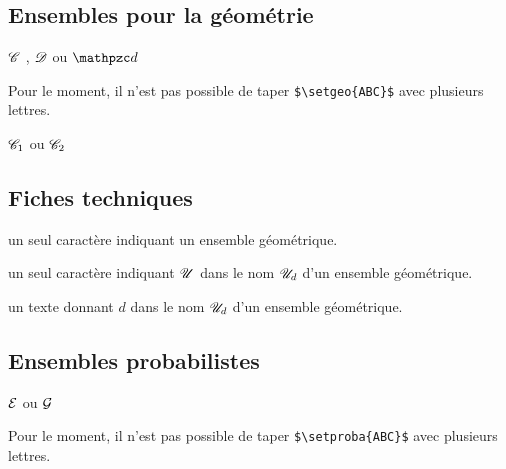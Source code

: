 \documentclass[12pt,a4paper]{article}
\begin{document}
\subsection{Ensembles pour la géométrie} \label{tnssets-geo-sets}

\newparaexample{}

\begin{latexex}
$\setgeo{C}$ ,
$\setgeo{D}$ ou
$\setgeo{d}$
\end{latexex}

\begin{remark}
	Pour le moment, il n'est pas possible de taper \verb+$\setgeo{ABC}$+ avec plusieurs lettres.
\end{remark}





\begin{latexex}
$\setgeo*{C}{1}$ ou
$\setgeo*{C}{2}$
\end{latexex}




\subsection{Fiches techniques}


\IDarg{} un seul caractère \ascii{} indiquant un ensemble géométrique.


\separation



 un seul caractère \ascii{} indiquant $\setgeo{U}$ dans le nom $\setgeo*{U}{d}$ d'un ensemble géométrique.

 un texte donnant $d$ dans le nom $\setgeo*{U}{d}$ d'un ensemble géométrique.




\subsection{Ensembles probabilistes} \label{tnssets-proba-sets}

\newparaexample{}

\begin{latexex}
$\setproba{E}$ ou
$\setproba{G}$
\end{latexex}

\begin{remark}
	Pour le moment, il n'est pas possible de taper \verb+$\setproba{ABC}$+ avec plusieurs lettres.
\end{remark}
\end{document}
